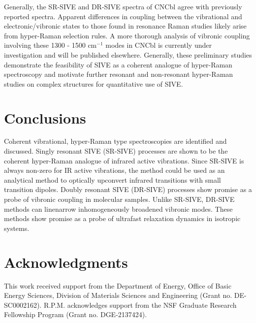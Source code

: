 \documentclass[aip, jcp, reprint, onecolumn]{revtex4-2}
\begin{document}
Generally, the SR-SIVE and DR-SIVE spectra of CNCbl agree with previously reported spectra.
Apparent differences in coupling between the vibrational and electronic/vibronic states to those found in resonance Raman studies likely arise from hyper-Raman selection rules. 
A more thorough analysis of vibronic coupling involving these 1300 - 1500 cm$^{-1}$ modes in CNCbl is currently under investigation and will be published elsewhere. \cite{Kaufman2024_1}
Generally, these preliminary studies demonstrate the feasibility of SIVE as a coherent analogue of hyper-Raman spectroscopy and motivate further resonant and non-resonant hyper-Raman studies on complex structures for quantitative use of SIVE.\cite{MyersKelley2008}

\section{Conclusions}
Coherent vibrational, hyper-Raman type spectroscopies are identified and discussed.
Singly resonant SIVE (SR-SIVE) processes are shown to be the coherent hyper-Raman analogue of infrared active vibrations.
Since SR-SIVE is always non-zero for IR active vibrations, the method could be used as an analytical method to optically upconvert infrared transitions with small transition dipoles.
Doubly resonant SIVE (DR-SIVE) processes show promise as a probe of vibronic coupling in molecular samples.
Unlike SR-SIVE, DR-SIVE methods can linenarrow inhomogeneously broadened vibronic modes. 
These methods show promise as a probe of ultrafast relaxation dynamics in isotropic systems.

\section{Acknowledgments}
This work received support from the Department of Energy, Office of Basic Energy Sciences, Division of Materials Sciences and Engineering (Grant no. DE-SC0002162).
R.P.M. acknowledges support from the NSF Graduate Research Fellowship Program (Grant no. DGE-2137424). 
\end{document}
